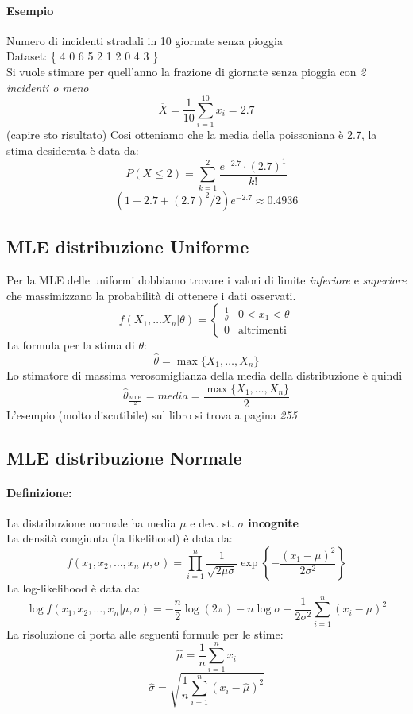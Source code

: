 \documentclass[]{article}
\newcommand{\definizione}{\paragraph{Definizione:}}
\begin{document}
    \paragraph{Esempio} Numero di incidenti stradali in 10 giornate senza pioggia \\
    Dataset: \{ 4 0 6 5 2 1 2 0 4 3 \} \\
    Si vuole stimare per quell'anno la frazione di giornate senza pioggia con \textit{2 incidenti o meno}
    \[ \overline{X} = \frac{1}{10} \sum_{i = 1}^{10} x_i = \boldsymbol{2.7} \]
    (capire sto risultato) Cosi otteniamo che la media della poissoniana è 2.7, la stima desiderata è data da:
    \[ P(X \leq 2) = \sum_{k=1}^{2} \frac{e^{-2.7} \cdot (2.7)^1 }{k!} \]
    \[ (1+2.7+ (2.7)^2 /2 ) e^{-2.7} \approx 0.4936 \]
    \subsection{MLE distribuzione Uniforme}
    Per la MLE delle uniformi dobbiamo trovare i valori di limite \textit{inferiore} e \textit{superiore} che massimizzano la probabilità di ottenere i dati osservati.
    \begin{equation*}
        f(X_1, \ldots X_n \rvert \theta) =
        \begin{cases}
            \frac{1}{\theta} & 0 < x_1 < \theta \\
            0 & \text{altrimenti}
        \end{cases}
    \end{equation*}
    La formula per la stima di $\theta$:
    \[ \hat{\theta} = \max \{ X_1, \ldots, X_n \} \]
    Lo stimatore di massima verosomiglianza della media della distribuzione è quindi
    \[ \hat{\theta}_{\frac{\text{MLE}}{2}} = \textit{media} = \frac{\max \{ X_1, \ldots, X_n \}}{2} \]
    L'esempio (molto discutibile) sul libro si trova a pagina \textit{255}
    \subsection{MLE distribuzione Normale } 
    \definizione La distribuzione normale ha media $\mu$ e dev. st. $\sigma$ \textbf{incognite} \\
    La densità congiunta (la likelihood) è data da:
    \[ f(x_1, x_2, \ldots, x_n \rvert \mu, \sigma) = \prod_{i= 1}^{n} \frac{1}{\sqrt{2 \mu \sigma}} \exp \left \{ - \frac{(x_1-\mu)^2}{2 \sigma^2} \right \} \]
    La log-likelihood è data da:
    \[ \log f(x_1, x_2, \ldots, x_n \rvert \mu, \sigma) = - \frac{n}{2} \log(2\pi) - n \log \sigma - \frac{1}{2\sigma^2} \sum_{i = 1}^{n} (x_i - \mu)^2 \]
    La risoluzione ci porta alle seguenti formule per le stime:
    \[ \hat{\mu} = \frac{1}{n} \sum_{i = 1}^{n} x_i \]
    \[ \hat{\sigma} = \sqrt{\frac{1}{n} \sum_{i = 1}^{n}(x_i - \hat{\mu})^2 } \]
\end{document}

